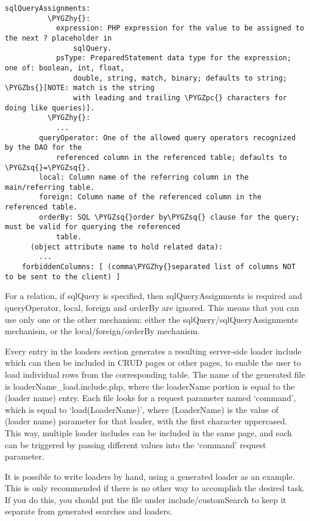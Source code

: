 \documentclass[letterpaper,10pt,english]{sphinxmanual}
\def\PYGZbs{\char`\\}
\def\PYGZpc{\char`\%}
\def\PYGZhy{\char`\-}
\def\PYGZsq{\char`\'}
\renewcommand\PYGZsq{\textquotesingle}
\begin{document}
\begin{Verbatim}[commandchars=\\\{\}]
        sqlQueryAssignments:
          \PYGZhy{}:
            expression: PHP expression for the value to be assigned to the next ? placeholder in
                sqlQuery.
            psType: PreparedStatement data type for the expression; one of: boolean, int, float,
                double, string, match, binary; defaults to string; \PYGZbs{}[NOTE: match is the string
                with leading and trailing \PYGZpc{} characters for doing like queries)].
          \PYGZhy{}:
            ...
        queryOperator: One of the allowed query operators recognized by the DAO for the
            referenced column in the referenced table; defaults to \PYGZsq{}=\PYGZsq{}.
        local: Column name of the referring column in the main/referring table.
        foreign: Column name of the referenced column in the referenced table.
        orderBy: SQL \PYGZsq{}order by\PYGZsq{} clause for the query; must be valid for querying the referenced
            table.
      (object attribute name to hold related data):
        ...
    forbiddenColumns: [ (comma\PYGZhy{}separated list of columns NOT to be sent to the client) ]
\end{Verbatim}

For a relation, if sqlQuery is specified, then sqlQueryAssignments is required and queryOperator,
local, foreign and orderBy are ignored.  This means that you can use only one or the other
mechanism: either the sqlQuery/sqlQueryAssignments mechanism, or the local/foreign/orderBy
mechanism.

Every entry in the loaders section generates a resulting server-side loader include which can then
be included in CRUD pages or other pages, to enable the user to load individual rows from the
corresponding table.  The name of the generated file is loaderName\_load.include.php, where the
loaderName portion is equal to the (loader name) entry.  Each file looks for a request parameter
named `command', which is equal to `load(LoaderName)', where (LoaderName) is the value of (loader
name) parameter for that loader, with the first character uppercased.  This way, multiple loader
includes can be included in the same page, and each can be triggered by passing different values
into the `command' request parameter.

It is possible to write loaders by hand, using a generated loader as an example.  This is only
recommended if there is no other way to accomplish the desired task.  If you do this, you should put
the file under include/customSearch to keep it separate from generated searches and loaders.
\end{document}
